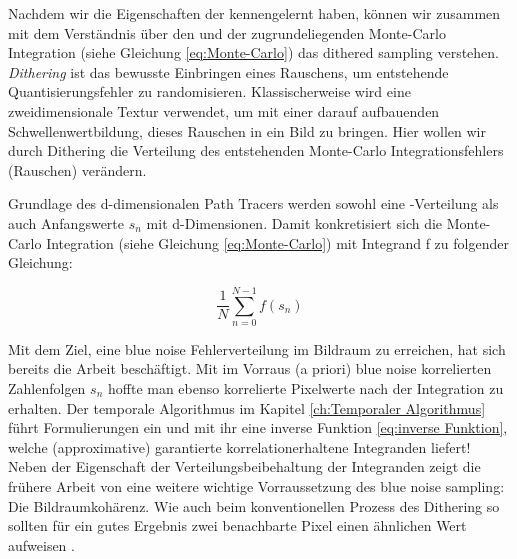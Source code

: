 \label{subsec:dither sampling}
Nachdem wir die Eigenschaften der  kennengelernt haben,
können wir zusammen mit dem Verständnis über den  und der 
zugrundeliegenden Monte-Carlo Integration (siehe Gleichung \ref{eq:Monte-Carlo}) das \glqq dithered sampling\grqq{} verstehen.
\textit{Dithering} ist das bewusste Einbringen eines Rauschens, um entstehende Quantisierungsfehler zu randomisieren.
Klassischerweise wird eine zweidimensionale  Textur verwendet, um mit einer darauf aufbauenden Schwellenwertbildung,
dieses Rauschen in ein Bild zu bringen. Hier wollen wir durch Dithering die Verteilung des entstehenden Monte-Carlo Integrationsfehlers (Rauschen) verändern.\par
Grundlage des d-dimensionalen Path Tracers werden sowohl eine -Verteilung als auch Anfangswerte $s_{n}$ mit d-Dimensionen.
Damit konkretisiert sich die Monte-Carlo Integration (siehe Gleichung \ref{eq:Monte-Carlo}) mit Integrand f zu folgender Gleichung:

\begin{tcolorbox}[rightrule=3mm, rounded corners=east]
    \begin{equation}\label{eq:concreteMonteCarlo}
        \frac{1}{N}\sum_{n=0}^{N-1}f(s_{n})
    \end{equation}
\end{tcolorbox}


Mit dem Ziel, eine blue noise Fehlerverteilung im Bildraum zu erreichen, hat sich bereits die Arbeit \cite{georgiev2016blue} beschäftigt. 
Mit im Vorraus (\glqq a priori\grqq{}) blue noise korrelierten Zahlenfolgen $s_{n}$ hoffte man ebenso korrelierte Pixelwerte nach 
der Integration zu erhalten. Der temporale Algorithmus im Kapitel \ref{ch:Temporaler Algorithmus} führt 
Formulierungen ein und mit ihr eine inverse Funktion \ref{eq:inverse Funktion}, welche (approximative) garantierte korrelationerhaltene Integranden liefert!  
Neben der Eigenschaft der Verteilungsbeibehaltung der Integranden zeigt die frühere Arbeit von \cite[Seite 3]{hal02158423} eine weitere wichtige Vorraussetzung 
des blue noise sampling: Die Bildraumkohärenz. Wie auch beim konventionellen Prozess des Dithering so sollten für ein gutes Ergebnis zwei benachbarte 
Pixel einen ähnlichen Wert aufweisen \cite{3288}.




